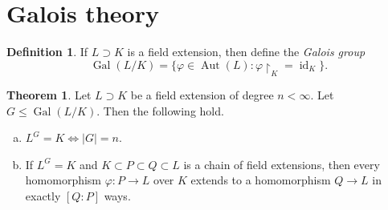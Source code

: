 \documentclass[10pt,letterpaper,cm]{nupset}
\theoremstyle{definition}
\newtheorem*{definition}{Definition}
\newtheorem{theorem}{Theorem}
\newcommand{\1}{\mathbf{1}}
\newcommand{\0}{\vec 0}
\DeclareMathOperator{\id}{id}
\DeclareMathOperator{\gal}{Gal}
\DeclareMathOperator{\aut}{Aut}
\begin{document}
\section{Galois theory}

\begin{definition}
If $L \supset K$ is a field extension, then define the \textit{Galois group} $$\gal(L/K) = \{\varphi \in \aut(L) : \varphi\restriction_K = \id_K\}.    $$
\end{definition}

\begin{theorem}
Let $L \supset K$ be a field extension of degree $n<\infty$. Let $G \leq  \gal(L/K)$. Then the following hold.
\begin{enumerate}[(a)]
\item $L^G = K \iff |G| = n$.
\item  If $L^G = K$ and $K \subset P \subset Q \subset L$ is a chain of field extensions, then every homomorphism $\varphi : P \to L$ over $K$ extends to a homomorphism $Q \to L$ in exactly $[Q:P]$ ways. 
\end{enumerate}
\end{theorem}
\end{document}

